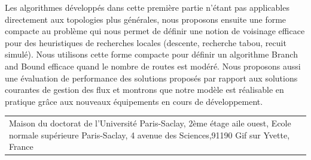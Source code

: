 \begin{mdframed}[linecolor=Prune,linewidth=1]
\begin{small}
\begin{multicols}{2}
Les algorithmes développés dans cette première partie n’étant pas applicables directement aux topologies plus générales, nous proposons ensuite une forme compacte au problème qui nous permet de définir une notion de voisinage efficace pour des heuristiques de recherches locales (descente, recherche tabou, recuit simulé). Nous utilisons cette forme compacte pour définir un algorithme Branch and Bound efficace quand le nombre de routes est modéré.
Nous proposons aussi une évaluation de performance des solutions proposés par rapport aux solutions courantes de gestion des flux et montrons que notre modèle est réalisable en pratique grâce aux nouveaux équipements en cours de développement.
\end{multicols}
\end{small}
\end{mdframed}

\vspace{7cm} %
\selectfont
\begin{tabular}{p{14cm}r}
\multirow{3}{16cm}[+0mm]{{\color{Prune} Maison du doctorat de l'Université Paris-Saclay, 2ème étage aile ouest, Ecole normale supérieure Paris-Saclay, 4 avenue des Sciences,91190 Gif sur Yvette, France}} & \\
\end{tabular}
\newpage
{}\selectfont
\noindent 

